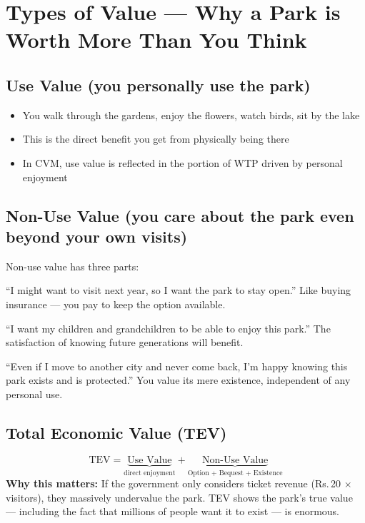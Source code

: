 \documentclass[11pt, a4paper]{article}
\newcommand{\rupee}{Rs.\,}
\newenvironment{keybox}{%
    \def\FrameCommand{\textcolor{accent}{\vrule width 2pt}\hspace{8pt}}%
    \MakeFramed{\advance\hsize-\width\FrameRestore}%
}{%
    \endMakeFramed%
}
\begin{document}
\section{Types of Value --- Why a Park is Worth More Than You Think}

\subsection{Use Value (you personally use the park)}
\begin{itemize}[nosep]
    \item You walk through the gardens, enjoy the flowers, watch birds, sit by the lake
    \item This is the direct benefit you get from physically being there
    \item In CVM, use value is reflected in the portion of WTP driven by personal enjoyment
\end{itemize}

\subsection{Non-Use Value (you care about the park even beyond your own visits)}

Non-use value has three parts:

\begin{description}[style=nextline]
    \item[\textcolor{accent}{(a) Option Value}] ``I might want to visit next year, so I want the park to stay open.'' Like buying insurance --- you pay to keep the option available.
    \item[\textcolor{accent}{(b) Bequest Value}] ``I want my children and grandchildren to be able to enjoy this park.'' The satisfaction of knowing future generations will benefit.
    \item[\textcolor{accent}{(c) Existence Value}] ``Even if I move to another city and never come back, I'm happy knowing this park exists and is protected.'' You value its mere existence, independent of any personal use.
\end{description}

\subsection{Total Economic Value (TEV)}

\begin{keybox}
\[
\text{TEV} = \underbrace{\text{Use Value}}_{\text{direct enjoyment}} + \underbrace{\text{Non-Use Value}}_{\text{Option + Bequest + Existence}}
\]
\textbf{Why this matters:} If the government only considers ticket revenue (\rupee 20 $\times$ visitors), they massively undervalue the park. TEV shows the park's true value --- including the fact that millions of people want it to exist --- is enormous.
\end{keybox}
\end{document}
